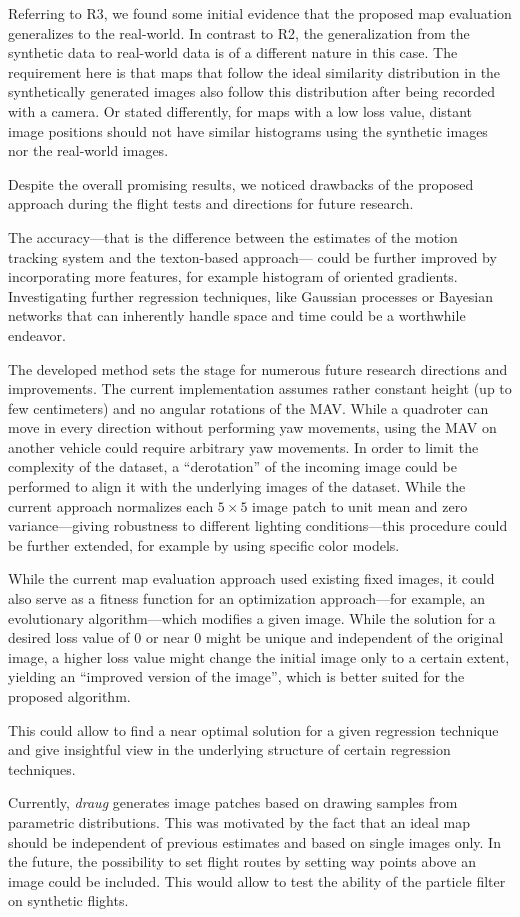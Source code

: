 Referring to R3, we found some initial evidence that the proposed map evaluation generalizes to the real-world. In contrast to R2, the generalization from the synthetic data to real-world data is of a different nature in this case. The requirement here is that maps that follow the ideal similarity distribution in the synthetically generated images also follow this distribution after being recorded with a camera. Or stated differently, for maps with a low loss value, distant image positions should not have similar histograms using the synthetic images nor the real-world images.  

Despite the overall promising results, we noticed drawbacks of the proposed approach
during the flight tests and directions for future research.

The accuracy—that is the difference between the estimates of the motion tracking system and the texton-based approach—
could be further improved by incorporating more features, for example
histogram of oriented gradients. Investigating further regression
techniques, like Gaussian processes or Bayesian networks that can
inherently handle space and time could be a worthwhile endeavor.

The developed method sets the stage for numerous future research
directions and improvements. The current implementation assumes rather
constant height (up to few centimeters) and no angular rotations of
the MAV. While a quadroter can move in every direction without
performing yaw movements, using the MAV on another vehicle could
require arbitrary yaw movements. In order to limit the complexity of
the dataset, a ``derotation'' of the incoming image could be performed
to align it with the underlying images of the dataset. While the
current approach normalizes each $5\times5$ image patch to unit mean
and zero variance---giving robustness to different lighting
conditions---this procedure could be further extended, for example by
using specific color models.

While the current map evaluation approach used existing fixed images,
it could also serve as a fitness function for an optimization
approach---for example, an evolutionary algorithm---which modifies a
given image. While the solution for a desired loss value of 0 or near 0 might be unique and independent of the original image, a higher loss value might change the initial image only to a certain extent, yielding an “improved version of the image”, which is better suited for the proposed algorithm. 

This could allow to find a near optimal solution for a
given regression technique and give insightful view in the underlying
structure of certain regression techniques.

Currently, \emph{draug} generates image patches based on drawing
samples from parametric distributions. This was motivated by the fact that an ideal map should be independent of previous estimates and based on single images only.  
In the future, the
possibility to set flight routes by setting way points above an image could be included. This would allow
to test the ability of the particle filter on synthetic flights.